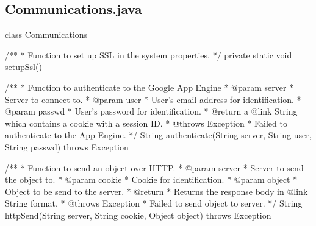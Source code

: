 \subsection{Communications.java}
\begin{code}
class Communications {

	/**
	 * Function to set up SSL in the system properties. 
	 */
	private static void setupSsl() {

	}
	
	/**
	 * Function to authenticate to the Google App Engine
	 * @param server
	 *     Server to connect to.
	 * @param user
	 *     User's email address for identification.
	 * @param passwd
	 *     User's password for identification.
	 * @return a {@link String} which contains a cookie with a session ID.
	 * @throws Exception
	 *     Failed to authenticate to the App Engine.
	 */
	String authenticate(String server, String user, String passwd) 
	  throws Exception {

	}
	
	/**
	 * Function to send an object over HTTP.
	 * @param server
	 *     Server to send the object to.
	 * @param cookie
	 *     Cookie for identification.
	 * @param object
	 *     Object to be send to the server.
	 * @return
	 *     Returns the response body in {@link String} format.
	 * @throws Exception
	 *     Failed to send object to server.
	 */
	String httpSend(String server, String cookie, Object object) 
	  throws Exception {

	}
}
\end{code}
